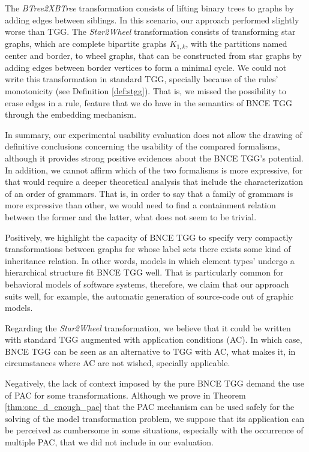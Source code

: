 The \emph{BTree2XBTree} transformation consists of lifting binary trees to graphs by adding edges between siblings. In this scenario, our approach performed slightly worse than TGG. The \emph{Star2Wheel} transformation consists of transforming star graphs, which are complete bipartite graphs $K_{1,k}$, with the partitions named center and border, to wheel graphs, that can be constructed from star graphs by adding edges between border vertices to form a minimal cycle. We could not write this transformation in standard TGG, specially because of the rules' monotonicity (see Definition \ref{def:stgg}). That is, we missed the possibility to erase edges in a rule, feature that we do have in the semantics of BNCE TGG through the embedding mechanism.


In summary, our experimental usability evaluation does not allow the drawing of definitive conclusions concerning the usability of the compared formalisms, although it provides strong positive evidences about the BNCE TGG's potential. In addition, we cannot affirm which of the two formalisms is more expressive, for that would require a deeper theoretical analysis that include the characterization of an order of grammars. That is, in order to say that a family of grammars is more expressive than other, we would need to find a containment relation between the former and the latter, what does not seem to be trivial.

Positively, we highlight the capacity of BNCE TGG to specify very compactly transformations between graphs for whose label sets there exists some kind of inheritance relation. In other words, models in which element types' undergo a hierarchical structure fit BNCE TGG well. That is particularly common for behavioral models of software systems, therefore, we claim that our approach suits well, for example, the automatic generation of source-code out of graphic models.

Regarding the \emph{Star2Wheel} transformation, we believe that it could be written with standard TGG augmented with application conditions (AC). In which case, BNCE TGG can be seen as an alternative to TGG with AC, what makes it, in circumstances where AC are not wished, specially applicable.

Negatively, the lack of context imposed by the pure BNCE TGG demand the use of PAC for some transformations. Although we prove in Theorem \ref{thm:one_d_enough_pac} that the PAC mechanism can be used safely for the solving of the model transformation problem, we suppose that its application can be perceived as cumbersome in some situations, especially with the occurrence of multiple PAC, that we did not include in our evaluation.

